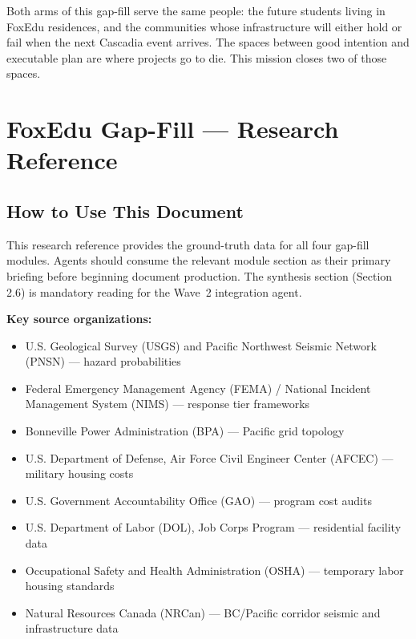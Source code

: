 \documentclass[11pt,letterpaper]{article}
\newcommand{\stageheader}[2]{%
  \noindent\colorbox{#2}{\makebox[\textwidth][l]{%
    \textcolor{white}{\bfseries\sffamily\hspace{6pt}#1\hspace{6pt}}}}%
  \vspace{0.5em}\par%
}
\begin{document}
Both arms of this gap-fill serve the same people: the future students living in FoxEdu residences, and the communities whose infrastructure will either hold or fail when the next Cascadia event arrives. The spaces between good intention and executable plan are where projects go to die. This mission closes two of those spaces.

\newpage
\stageheader{STAGE 2 --- RESEARCH REFERENCE}{secondary}

\section{FoxEdu Gap-Fill --- Research Reference}

\subsection{How to Use This Document}

This research reference provides the ground-truth data for all four gap-fill modules. Agents should consume the relevant module section as their primary briefing before beginning document production. The synthesis section (Section 2.6) is mandatory reading for the Wave~2 integration agent.

\textbf{Key source organizations:}
\begin{itemize}[leftmargin=1.5em]
  \item U.S. Geological Survey (USGS) and Pacific Northwest Seismic Network (PNSN) --- hazard probabilities
  \item Federal Emergency Management Agency (FEMA) / National Incident Management System (NIMS) --- response tier frameworks
  \item Bonneville Power Administration (BPA) --- Pacific grid topology
  \item U.S. Department of Defense, Air Force Civil Engineer Center (AFCEC) --- military housing costs
  \item U.S. Government Accountability Office (GAO) --- program cost audits
  \item U.S. Department of Labor (DOL), Job Corps Program --- residential facility data
  \item Occupational Safety and Health Administration (OSHA) --- temporary labor housing standards
  \item Natural Resources Canada (NRCan) --- BC/Pacific corridor seismic and infrastructure data
\end{itemize}
\end{document}
